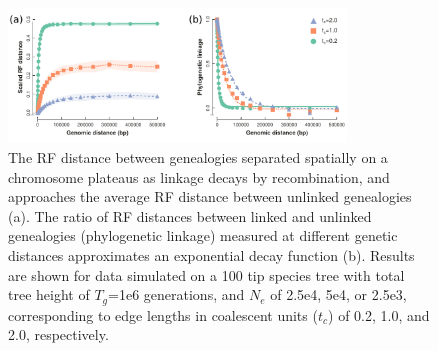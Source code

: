 \documentclass[11pt]{article}
\begin{document}
\begin{figure}
	\centering
		\includegraphics[width=0.8\textwidth]{./figures/Fig-2}
		\caption{
		The RF distance between genealogies separated spatially on a chromosome plateaus as linkage decays by recombination, and  approaches the average RF distance between unlinked genealogies (a). The ratio of RF distances between linked and unlinked genealogies (phylogenetic linkage) measured at different genetic distances approximates an exponential decay function (b). Results are shown for data simulated on a 100 tip species tree with total tree height of $T_g$=1e6 generations, and $N_e$ of 2.5e4, 5e4, or 2.5e3, corresponding to edge lengths in coalescent units ($t_c$) of 0.2, 1.0, and 2.0, respectively. 
		}
		\label{fig:2}
\end{figure}


\end{document}
